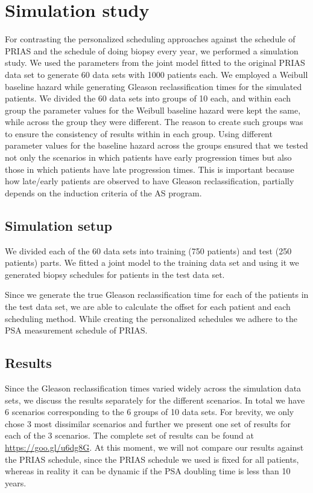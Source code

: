 
\section{Simulation study}
\label{sec: simulation_study}
For contrasting the personalized scheduling approaches against the schedule of PRIAS and the schedule of doing biopsy every year, we performed a simulation study. We used the parameters from the joint model fitted to the original PRIAS data set to generate 60 data sets with 1000 patients each. We employed a Weibull baseline hazard while generating Gleason reclassification times for the simulated patients. We divided the 60 data sets into groups of 10 each, and within each group the parameter values for the Weibull baseline hazard were kept the same, while across the group they were different. The reason to create such groups was to ensure the consistency of results within in each group. Using different parameter values for the baseline hazard across the groups ensured that we tested not only the scenarios in which patients have early progression times but also those in which patients have late progression times. This is important because how late/early patients are observed to have Gleason reclassification, partially depends on the induction criteria of the AS program.

\subsection{Simulation setup}
\label{subsec : simulation_setup}
We divided each of the 60 data sets into training (750 patients) and test (250 patients) parts. We fitted a joint model to the training data set and using it we generated biopsy schedules for patients in the test data set.


Since we generate the true Gleason reclassification time for each of the patients in the test data set, we are able to calculate the offset for each patient and each scheduling method. While creating the personalized schedules we adhere to the PSA measurement schedule of PRIAS. 

\subsection{Results}
Since the Gleason reclassification times varied widely across the simulation data sets, we discuss the results separately for the different scenarios. In total we have 6 scenarios corresponding to the 6 groups of 10 data sets. For brevity, we only chose 3 most dissimilar scenarios and further we present one set of results for each of the 3 scenarios. The complete set of results can be found at \url{https://goo.gl/u6dg8G}. At this moment, we will not compare our results against the PRIAS schedule, since the PRIAS schedule we used is fixed for all patients, whereas in reality it can be dynamic if the PSA doubling time is less than 10 years.


